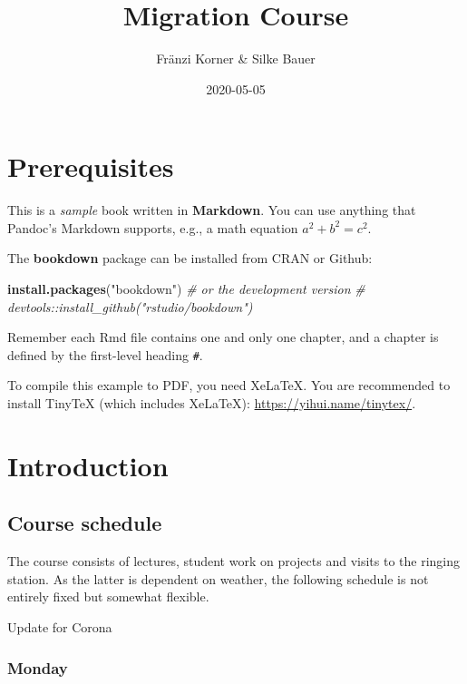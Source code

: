 \documentclass[
]{book}
\title{Migration Course}
\author{Fränzi Korner \& Silke Bauer}
\date{2020-05-05}
\newenvironment{Shaded}{\begin{snugshade}}{\end{snugshade}}
\newcommand{\CommentTok}[1]{\textcolor[rgb]{0.56,0.35,0.01}{\textit{#1}}}
\newcommand{\KeywordTok}[1]{\textcolor[rgb]{0.13,0.29,0.53}{\textbf{#1}}}
\newcommand{\NormalTok}[1]{#1}
\newcommand{\StringTok}[1]{\textcolor[rgb]{0.31,0.60,0.02}{#1}}
\begin{document}
\maketitle

{
\setcounter{tocdepth}{1}
\tableofcontents
}
\hypertarget{prerequisites}{%
\chapter{Prerequisites}\label{prerequisites}}

This is a \emph{sample} book written in \textbf{Markdown}. You can use anything that Pandoc's Markdown supports, e.g., a math equation \(a^2 + b^2 = c^2\).

The \textbf{bookdown} package can be installed from CRAN or Github:

\begin{Shaded}
\begin{Highlighting}[]
\KeywordTok{install.packages}\NormalTok{(}\StringTok{"bookdown"}\NormalTok{)}
\CommentTok{# or the development version}
\CommentTok{# devtools::install_github("rstudio/bookdown")}
\end{Highlighting}
\end{Shaded}

Remember each Rmd file contains one and only one chapter, and a chapter is defined by the first-level heading \texttt{\#}.

To compile this example to PDF, you need XeLaTeX. You are recommended to install TinyTeX (which includes XeLaTeX): \url{https://yihui.name/tinytex/}.

\hypertarget{introduction}{%
\chapter{Introduction}\label{introduction}}

\hypertarget{course-schedule}{%
\section{Course schedule}\label{course-schedule}}

The course consists of lectures, student work on projects and visits to the ringing station. As the latter is dependent on weather, the following schedule is not entirely fixed but somewhat flexible.

Update for Corona

\hypertarget{monday}{%
\subsection{Monday}\label{monday}}
\end{document}
